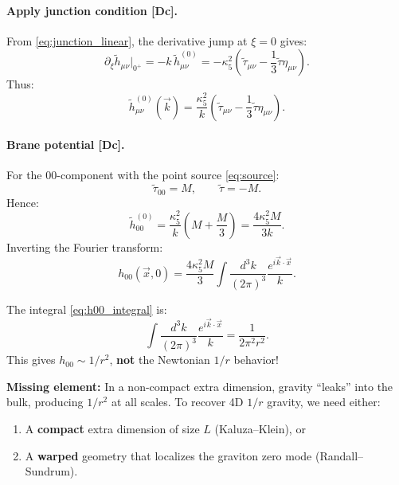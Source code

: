\documentclass[11pt,a4paper]{article}
\newcommand{\tagDc}{\textcolor{purple!70!black}{[Dc]}}
\begin{document}
\paragraph{Apply junction condition \tagDc{}.}
From \eqref{eq:junction_linear}, the derivative jump at $\xi = 0$ gives:
\begin{equation}
    \partial_\xi \tilde{h}_{\mu\nu}\big|_{0^+} = -k \, \tilde{h}_{\mu\nu}^{(0)} = -\kappa_5^2 \left( \tilde{\tau}_{\mu\nu} - \frac{1}{3} \tilde{\tau} \eta_{\mu\nu} \right).
\end{equation}
Thus:
\begin{equation}
    \tilde{h}_{\mu\nu}^{(0)}(\vec{k}) = \frac{\kappa_5^2}{k} \left( \tilde{\tau}_{\mu\nu} - \frac{1}{3} \tilde{\tau} \eta_{\mu\nu} \right).
    \label{eq:h_brane}
\end{equation}

\paragraph{Brane potential \tagDc{}.}
For the $00$-component with the point source \eqref{eq:source}:
\begin{equation}
    \tilde{\tau}_{00} = M, \qquad \tilde{\tau} = -M.
\end{equation}
Hence:
\begin{equation}
    \tilde{h}_{00}^{(0)} = \frac{\kappa_5^2}{k} \left( M + \frac{M}{3} \right) = \frac{4\kappa_5^2 M}{3k}.
\end{equation}
Inverting the Fourier transform:
\begin{equation}
    h_{00}(\vec{x}, 0) = \frac{4\kappa_5^2 M}{3} \int \frac{d^3k}{(2\pi)^3} \frac{e^{i\vec{k}\cdot\vec{x}}}{k}.
    \label{eq:h00_integral}
\end{equation}

\begin{failbox}
The integral \eqref{eq:h00_integral} is:
\begin{equation}
    \int \frac{d^3k}{(2\pi)^3} \frac{e^{i\vec{k}\cdot\vec{x}}}{k} = \frac{1}{2\pi^2 r^2}.
    \label{eq:integral_result}
\end{equation}
This gives $h_{00} \sim 1/r^2$, \textbf{not} the Newtonian $1/r$ behavior!

\textbf{Missing element:} In a non-compact extra dimension, gravity ``leaks'' into the bulk, producing $1/r^2$ at all scales. To recover 4D $1/r$ gravity, we need either:
\begin{enumerate}[nosep]
    \item A \textbf{compact} extra dimension of size $L$ (Kaluza--Klein), or
    \item A \textbf{warped} geometry that localizes the graviton zero mode (Randall--Sundrum).
\end{enumerate}
\end{failbox}
\end{document}
